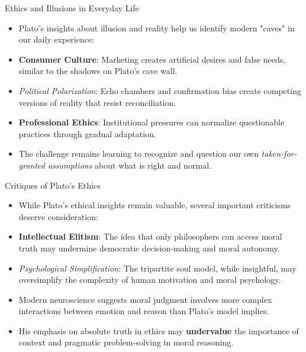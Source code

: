 \documentclass[aspectratio=169]{beamer}
\begin{document}
\begin{frame}{Ethics and Illusions in Everyday Life}
\begin{itemize}
\item Plato's insights about illusion and reality help us identify modern "caves" in our daily experience:
\item \textbf{Consumer Culture}: Marketing creates artificial desires and false needs, similar to the shadows on Plato's cave wall.
\item \emph{Political Polarization}: Echo chambers and confirmation bias create competing versions of reality that resist reconciliation.
\item \textbf{Professional Ethics}: Institutional pressures can normalize questionable practices through gradual adaptation.
\item The challenge remains learning to recognize and question our own \emph{taken-for-granted assumptions} about what is right and normal.
\end{itemize}
\end{frame}

\begin{frame}{Critiques of Plato's Ethics}
\begin{itemize}
\item While Plato's ethical insights remain valuable, several important criticisms deserve consideration:
\item \textbf{Intellectual Elitism}: The idea that only philosophers can access moral truth may undermine democratic decision-making and moral autonomy.
\item \emph{Psychological Simplification}: The tripartite soul model, while insightful, may oversimplify the complexity of human motivation and moral psychology.
\item Modern neuroscience suggests moral judgment involves more complex interactions between emotion and reason than Plato's model implies.
\item His emphasis on absolute truth in ethics may \textbf{undervalue} the importance of context and pragmatic problem-solving in moral reasoning.
\end{itemize}
\end{frame}
\end{document}
